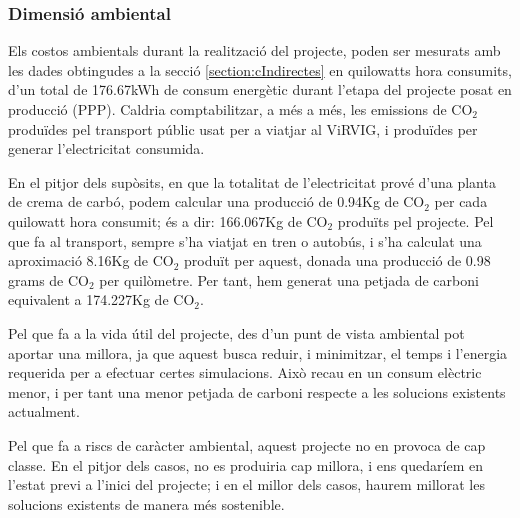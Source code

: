 \documentclass[a4paper]{report}
\begin{document}
	\subsubsection{Dimensió ambiental}
	Els costos ambientals durant la realització del projecte, poden ser mesurats amb les dades obtingudes a la secció \ref{section:cIndirectes} en quilowatts hora consumits, d'un total de 176.67kWh de consum energètic durant l'etapa del projecte posat en producció (PPP). Caldria comptabilitzar, a més a més, les emissions de CO$_{2}$ produïdes pel transport públic usat per a viatjar al ViRVIG, i produïdes per generar l'electricitat consumida. \par
	En el pitjor dels supòsits, en que la totalitat de l'electricitat prové d'una planta de crema de carbó, podem calcular una producció de 0.94Kg de CO$_2$ per cada quilowatt hora consumit; és a dir: 166.067Kg de CO$_2$ produïts pel projecte. Pel que fa al transport, sempre s'ha viatjat en tren o autobús, i s'ha calculat una aproximació 8.16Kg de CO$_2$ produït per aquest, donada una producció de 0.98 grams de CO$_2$ per quilòmetre. Per tant, hem generat una petjada de carboni equivalent a 174.227Kg de CO$_2$. \par
	Pel que fa a la vida útil del projecte, des d'un punt de vista ambiental pot aportar una millora, ja que aquest busca reduir, i minimitzar, el temps i l'energia requerida per a efectuar certes simulacions. Això recau en un consum elèctric menor, i per tant una menor petjada de carboni respecte a les solucions existents actualment. \par
	Pel que fa a riscs de caràcter ambiental, aquest projecte no en provoca de cap classe. En el pitjor dels casos, no es produiria cap millora, i ens quedaríem en l'estat previ a l'inici del projecte; i en el millor dels casos, haurem millorat les solucions existents de manera més sostenible.
	
\end{document}
